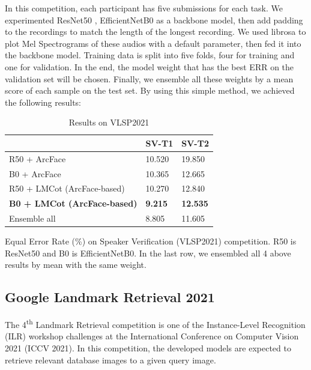 In this competition, each participant has five submissions for each task. We experimented ResNet50 \cite{He2016DeepRL}, EfficientNetB0 \cite{tan2019efficientnet} as a backbone model, then add padding to the recordings to match the length of the longest recording. We used librosa \cite{mcfee2015librosa} to plot Mel Spectrograms of these audios with a default parameter, then fed it into the backbone model. Training data is split into five folds, four for training and one for validation. In the end, the model weight that has the best ERR on the validation set will be chosen. Finally, we ensemble all these weights by a mean score of each sample on the test set. By using this simple method, we achieved the following results:
\begin{table}[htbp]
\caption{Results on VLSP2021}
\label{table03}
\centering
\begin{threeparttable}
    \begin{tabular}{|l|l|l|}
    \hline
                        & SV-T1          & SV-T2           \\ \hline
    R50 + ArcFace       & 10.520         & 19.850          \\ \hline
    B0 + ArcFace        & 10.365         & 12.665          \\ \hline
    R50 + LMCot (ArcFace-based)        & 10.270         & 12.840          \\ \hline
    \textbf{B0 + LMCot (ArcFace-based)} & \textbf{9.215} & \textbf{12.535} \\ \hline
    Ensemble all        & 8.805          & 11.605          \\ \hline
    \end{tabular}
    
    \begin{tablenotes}
      \small
      \item Equal Error Rate (\%) on Speaker Verification (VLSP2021) competition. R50 is ResNet50 and B0 is EfficientNetB0. In the last row, we ensembled all 4 above results by mean with the same weight.
    \end{tablenotes}
\end{threeparttable}
\end{table}

\subsection{Google Landmark Retrieval 2021} \label{s53}
The 4\textsuperscript{th} Landmark Retrieval competition is one of the Instance-Level Recognition (ILR) workshop challenges at the International Conference on Computer Vision 2021 (ICCV 2021). In this competition, the developed models are expected to retrieve relevant database images to a given query image.

